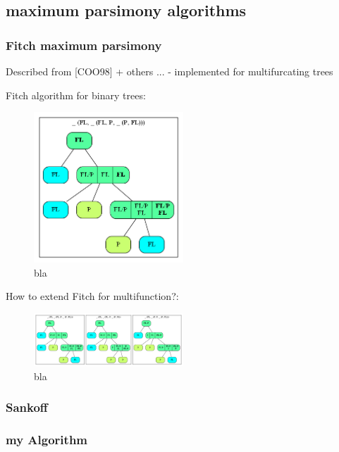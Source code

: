     \subsection{maximum parsimony algorithms}
      \subsubsection{Fitch maximum parsimony}
        Described from [COO98] + others ... - implemented for multifurcating trees

        Fitch algorithm for binary trees:
        \begin{figure}
          \caption{bla}
          \centering
            \includegraphics[width=0.5\textwidth]{Figures/Fitch1.png}
        \end{figure}

        How to extend Fitch for multifunction?:

        \begin{figure}
          \caption{bla}
          \centering
            \includegraphics[width=0.5\textwidth]{Figures/Fitch2.png}
        \end{figure}

      \subsubsection{Sankoff}
      \subsubsection{my Algorithm}


